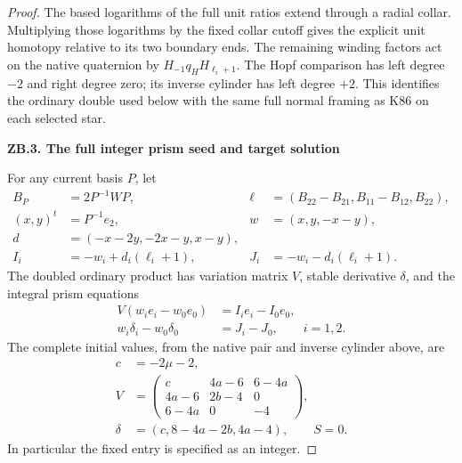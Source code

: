 \begin{proof}
The based logarithms of the full unit ratios extend through a radial
collar. Multiplying those logarithms by the fixed collar cutoff gives
the explicit unit homotopy relative to its two boundary ends. The
remaining winding factors act on the native quaternion by
\(H_{-1}q_HH_{\ell_i+1}\). The Hopf comparison has left degree
\(-2\) and right degree zero; its inverse cylinder has left degree
\(+2\). This identifies the ordinary double used below with the
same full normal framing as K86 on each selected star.

\par

\medskip\noindent\textbf{ZB.3. The full integer prism seed and target solution}

\par\nopagebreak[4]

For any current basis \(P\), let
\[
\begin{aligned}
B_P&=2P^{-1}WP,&
\ell&=(B_{22}-B_{21},B_{11}-B_{12},B_{22}),\\
(x,y)^t&=P^{-1}e_2,& w&=(x,y,-x-y),\\
d&=(-x-2y,-2x-y,x-y),\\
I_i&=-w_i+d_i(\ell_i+1),&
J_i&=-w_i-d_i(\ell_i+1).
\end{aligned}                                           \tag{ZB.5}
\]
The doubled ordinary product has variation matrix \(V\), stable
derivative \(\delta\), and the integral prism equations
\[
\begin{aligned}
V(w_i e_i-w_0e_0)&=I_ie_i-I_0e_0,\\
w_i\delta_i-w_0\delta_0&=J_i-J_0,\qquad i=1,2.
\end{aligned}                                           \tag{ZB.6}
\]
The complete initial values, from the native pair and inverse cylinder
above, are
\[
\begin{aligned}
c&=-2\mu-2,\\
V&=\begin{pmatrix}
c&4a-6&6-4a\\4a-6&2b-4&0\\6-4a&0&-4
\end{pmatrix},\\
\delta&=(c,8-4a-2b,4a-4),\qquad S=0.
\end{aligned}                                           \tag{ZB.7}
\]
In particular the fixed entry is specified as an integer.


\end{proof}
